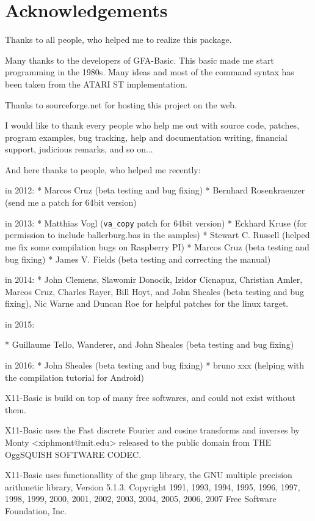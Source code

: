 
\chapter*{Acknowledgements}

Thanks to all people, who helped me to realize this package.

Many  thanks  to  the developers of GFA-Basic. This basic made me
start programming in the 1980s. Many ideas and most of  the  command 
syntax has been taken from the ATARI ST implementation.

Thanks to sourceforge.net for hosting this project on the web.

I would like to thank every people who help me out with source code, 
patches, program examples, bug tracking, help and documentation writing, 
financial support, judicious remarks, and so on...   

And here thanks to people, who helped me recently:

in 2012:
* Marcos Cruz (beta testing and bug fixing)
* Bernhard Rosenkraenzer (send me a patch for 64bit version)

in 2013:
* Matthias Vogl (\verb|va_copy| patch for 64bit version)
* Eckhard Kruse (for permission to include ballerburg.bas in the samples)
* Stewart C. Russell (helped me fix some compilation bugs on Raspberry PI)
* Marcos Cruz (beta testing and bug fixing)
* James V. Fields (beta testing and correcting the manual)

in 2014:
* John Clemens, Slawomir Donocik, Izidor Cicnapuz, Christian Amler,
  Marcos Cruz, Charles Rayer, Bill Hoyt, and John Sheales (beta testing and 
  bug fixing),
  Nic Warne and Duncan Roe for helpful patches for the linux target.

in 2015:

* Guillaume Tello, Wanderer, and John Sheales  (beta testing and bug fixing)

in 2016:
* John Sheales  (beta testing and bug fixing)
* bruno xxx (helping with the compilation tutorial for Android)

X11-Basic is build on top of many free softwares, and could not exist without 
them.

X11-Basic uses the Fast discrete Fourier and cosine transforms and inverses 
by Monty <xiphmont@mit.edu> released to the public domain from 
THE OggSQUISH SOFTWARE CODEC.

X11-Basic uses functionallity of the gmp library, 
the GNU multiple precision arithmetic library, Version 5.1.3.
   Copyright 1991, 1993, 1994, 1995, 1996, 1997, 1998, 1999, 2000,
2001, 2002, 2003, 2004, 2005, 2006, 2007 Free Software Foundation, Inc.

